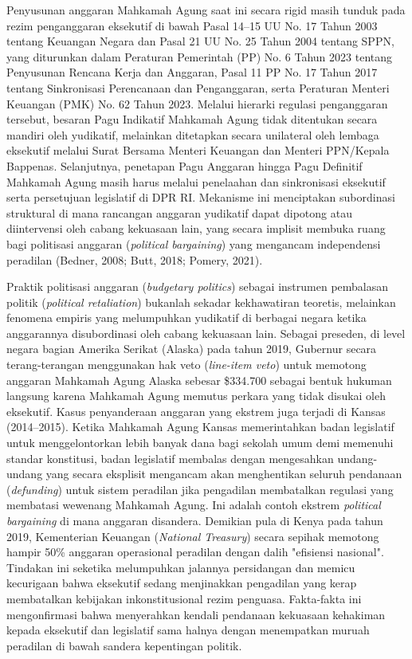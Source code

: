 \documentclass[12pt, a4paper]{article}
\begin{document}
Penyusunan anggaran Mahkamah Agung saat ini secara rigid masih tunduk pada rezim penganggaran eksekutif di bawah Pasal 14--15 UU No. 17 Tahun 2003 tentang Keuangan Negara dan Pasal 21 UU No. 25 Tahun 2004 tentang SPPN, yang diturunkan dalam Peraturan Pemerintah (PP) No. 6 Tahun 2023 tentang Penyusunan Rencana Kerja dan Anggaran, Pasal 11 PP No. 17 Tahun 2017 tentang Sinkronisasi Perencanaan dan Penganggaran, serta Peraturan Menteri Keuangan (PMK) No. 62 Tahun 2023. Melalui hierarki regulasi penganggaran tersebut, besaran Pagu Indikatif Mahkamah Agung tidak ditentukan secara mandiri oleh yudikatif, melainkan ditetapkan secara unilateral oleh lembaga eksekutif melalui Surat Bersama Menteri Keuangan dan Menteri PPN/Kepala Bappenas. Selanjutnya, penetapan Pagu Anggaran hingga Pagu Definitif Mahkamah Agung masih harus melalui penelaahan dan sinkronisasi eksekutif serta persetujuan legislatif di DPR RI. Mekanisme ini menciptakan subordinasi struktural di mana rancangan anggaran yudikatif dapat dipotong atau diintervensi oleh cabang kekuasaan lain, yang secara implisit membuka ruang bagi politisasi anggaran (\textit{political bargaining}) yang mengancam independensi peradilan (Bedner, 2008; Butt, 2018; Pomery, 2021).

Praktik politisasi anggaran (\textit{budgetary politics}) sebagai instrumen pembalasan politik (\textit{political retaliation}) bukanlah sekadar kekhawatiran teoretis, melainkan fenomena empiris yang melumpuhkan yudikatif di berbagai negara ketika anggarannya disubordinasi oleh cabang kekuasaan lain. Sebagai preseden, di level negara bagian Amerika Serikat (Alaska) pada tahun 2019, Gubernur secara terang-terangan menggunakan hak veto (\textit{line-item veto}) untuk memotong anggaran Mahkamah Agung Alaska sebesar \$334.700 sebagai bentuk hukuman langsung karena Mahkamah Agung memutus perkara yang tidak disukai oleh eksekutif. Kasus penyanderaan anggaran yang ekstrem juga terjadi di Kansas (2014--2015). Ketika Mahkamah Agung Kansas memerintahkan badan legislatif untuk menggelontorkan lebih banyak dana bagi sekolah umum demi memenuhi standar konstitusi, badan legislatif membalas dengan mengesahkan undang-undang yang secara eksplisit mengancam akan menghentikan seluruh pendanaan (\textit{defunding}) untuk sistem peradilan jika pengadilan membatalkan regulasi yang membatasi wewenang Mahkamah Agung. Ini adalah contoh ekstrem \textit{political bargaining} di mana anggaran disandera. Demikian pula di Kenya pada tahun 2019, Kementerian Keuangan (\textit{National Treasury}) secara sepihak memotong hampir 50\% anggaran operasional peradilan dengan dalih "efisiensi nasional". Tindakan ini seketika melumpuhkan jalannya persidangan dan memicu kecurigaan bahwa eksekutif sedang menjinakkan pengadilan yang kerap membatalkan kebijakan inkonstitusional rezim penguasa. Fakta-fakta ini mengonfirmasi bahwa menyerahkan kendali pendanaan kekuasaan kehakiman kepada eksekutif dan legislatif sama halnya dengan menempatkan muruah peradilan di bawah sandera kepentingan politik.
\end{document}
